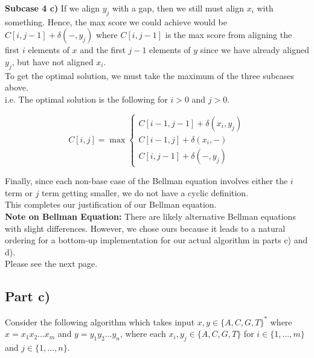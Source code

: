 \documentclass[12pt]{article}
\begin{document}
\textbf{Subcase 4 c)} If we align $y_j$ with a gap, then we still must align $x_i$ with something. Hence, the max score we could achieve would be $C[i, j-1] + \delta(-, y_j)$ where $C[i, j-1]$ is the max score from aligning the first $i$ elements of $x$ and the first $j-1$ elements of $y$ since we have already aligned $y_j$, but have not aligned $x_i$. \\

To get the optimal solution, we must take the maximum of the three subcases above. \\

i.e. The optimal solution is the following for $i > 0$ and $j > 0$.

\[
    C[i,j] = \max\begin{cases} 
        C[i-1,j-1] + \delta(x_i,y_j) \\
        C[i-1,j] + \delta(x_i,-) \\
        C[i,j-1] + \delta(-,y_j)
    \end{cases}
\]

Finally, since each non-base case of the Bellman equation involves either the $i$ term or $j$ term getting smaller, we do not have a cyclic definition. \\

This completes our justification of our Bellman equation. \\

\textbf{Note on Bellman Equation:} There are likely alternative Bellman equations with slight differences. However, we chose ours because it leads to a natural ordering for a bottom-up implementation for our actual algorithm in parts c) and d). \\

Please see the next page. 

\newpage

\subsection*{Part c)}

Consider the following algorithm which takes input $x,y \in \{A, C, G, T\}^*$ where $x = x_1x_2...x_m$ and $y = y_1y_2...y_n$, where each $x_i, y_j \in \{A, C, G, T\}$ for $i \in \{1,...,m\}$ and $j \in \{1,...,n\}$. \\
\end{document}
